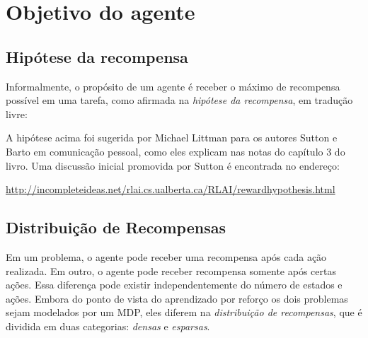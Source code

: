 \documentclass{article}
\begin{document}
    
    
    \section{Objetivo do agente}
    
        \subsection{Hipótese da recompensa}
    
            Informalmente, o propósito de um agente é receber o máximo de recompensa possível em uma tarefa, como afirmada na \emph{hipótese da recompensa}, em tradução livre:
            \begin{center}
            \noindent{}%
            \end{center}
            
            A hipótese acima foi sugerida por Michael Littman para os autores Sutton e Barto em comunicação pessoal, como eles explicam nas notas do capítulo 3 do livro. Uma discussão inicial promovida por Sutton é encontrada no endereço:
            
            \url{http://incompleteideas.net/rlai.cs.ualberta.ca/RLAI/rewardhypothesis.html}
            
        \subsection{Distribuição de Recompensas}

            Em um problema, o agente pode receber uma recompensa após cada ação realizada. Em outro, o agente pode receber recompensa somente após certas ações. Essa diferença pode existir independentemente do número de estados e ações. Embora do ponto de vista do aprendizado por reforço os dois problemas sejam modelados por um MDP, eles diferem na \emph{distribuição de recompensas}, que é dividida em duas categorias: \emph{densas} e \emph{esparsas}.
        
\end{document}
